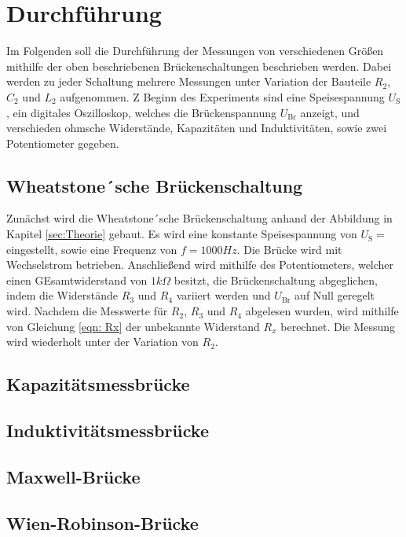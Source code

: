 \section{Durchführung} \label{sec:Durchführung}

    Im Folgenden soll die Durchführung der Messungen von verschiedenen Größen mithilfe der oben beschriebenen
    Brückenschaltungen beschrieben werden.
    Dabei werden zu jeder Schaltung mehrere Messungen unter Variation der Bauteile
    $R_2$, $C_2$ und $L_2$ aufgenommen.
    Z Beginn des Experiments sind eine Speisespannung $U_\text{S}$, ein digitales Oszilloskop, welches die
    Brückenspannung $U_\text{Br}$ anzeigt, und verschieden ohmsche Widerstände, Kapazitäten und Induktivitäten, sowie
    zwei Potentiometer gegeben.

\subsection{Wheatstone´sche Brückenschaltung}

    Zunächst wird die Wheatstone´sche Brückenschaltung anhand der Abbildung in Kapitel \ref{sec:Theorie} gebaut.
    Es wird eine konstante Speisespannung von $U_\text{S} = $ eingestellt, sowie eine Frequenz von $f = 1000Hz$.
    Die Brücke wird mit Wechselstrom betrieben.
    Anschließend wird mithilfe des Potentiometers, welcher einen GEsamtwiderstand von $1k\Omega$ besitzt,
    die Brückenschaltung abgeglichen, indem
    die Widerstände $R_3$ und $R_4$ variiert werden und $U_\text{Br}$ auf Null geregelt wird.
    Nachdem die Messwerte für $R_2$, $R_3$ und $R_4$ abgelesen wurden, wird mithilfe von Gleichung \eqref{eqn: Rx}
    der unbekannte Widerstand $R_x$ berechnet.
    Die Messung wird wiederholt unter der Variation von $R_2$.


\subsection{Kapazitätsmessbrücke}
\subsection{Induktivitätsmessbrücke}
\subsection{Maxwell-Brücke}
\subsection{Wien-Robinson-Brücke}
